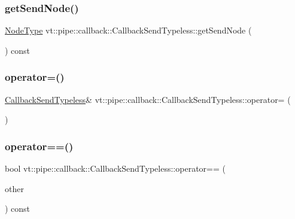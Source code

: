 \subsubsection{\texorpdfstring{get\+Send\+Node()}{getSendNode()}}
{\footnotesize\ttfamily \hyperlink{namespacevt_a866da9d0efc19c0a1ce79e9e492f47e2}{Node\+Type} vt\+::pipe\+::callback\+::\+Callback\+Send\+Typeless\+::get\+Send\+Node (\begin{DoxyParamCaption}{ }\end{DoxyParamCaption}) const\hspace{0.3cm}{\ttfamily [inline]}}

\mbox{\label{structvt_1_1pipe_1_1callback_1_1_callback_send_typeless_ab4637d4587695d0a0883aa2f547e2b0b}} 
\subsubsection{\texorpdfstring{operator=()}{operator=()}}
{\footnotesize\ttfamily \hyperlink{structvt_1_1pipe_1_1callback_1_1_callback_send_typeless}{Callback\+Send\+Typeless}\& vt\+::pipe\+::callback\+::\+Callback\+Send\+Typeless\+::operator= (\begin{DoxyParamCaption}\item[{\hyperlink{structvt_1_1pipe_1_1callback_1_1_callback_send_typeless}{Callback\+Send\+Typeless} const \&}]{ }\end{DoxyParamCaption})\hspace{0.3cm}{\ttfamily [default]}}

\mbox{\label{structvt_1_1pipe_1_1callback_1_1_callback_send_typeless_a0dd54476c2ab4f7222660b57e11ee659}} 
\subsubsection{\texorpdfstring{operator==()}{operator==()}}
{\footnotesize\ttfamily bool vt\+::pipe\+::callback\+::\+Callback\+Send\+Typeless\+::operator== (\begin{DoxyParamCaption}\item[{\hyperlink{structvt_1_1pipe_1_1callback_1_1_callback_send_typeless}{Callback\+Send\+Typeless} const \&}]{other }\end{DoxyParamCaption}) const\hspace{0.3cm}{\ttfamily [inline]}}

